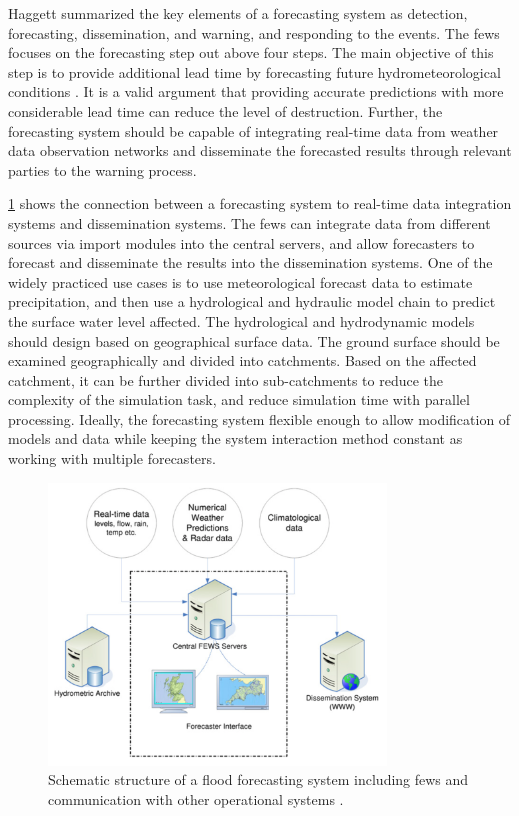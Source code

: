 Haggett \cite{Haggett1998AnWales} summarized the key elements of a forecasting system as detection, forecasting, dissemination, and warning, and responding to the events. The \acrshort{fews} focuses on the forecasting step out above four steps. The main objective of this step is to provide additional lead time by forecasting future hydrometeorological conditions \cite{Werner2005FloodCatchments}. It is a valid argument that providing accurate predictions with more considerable lead time can reduce the level of destruction. Further, the forecasting system should be capable of integrating real-time data from weather data observation networks and disseminate the forecasted results through relevant parties to the warning process.

\cref{fi:fews_schematic} shows the connection between a forecasting system to real-time data integration systems and dissemination systems. The \acrshort{fews} can integrate data from different sources via import modules into the central servers, and allow forecasters to forecast and disseminate the results into the dissemination systems. One of the widely practiced use cases is to use meteorological forecast data to estimate precipitation, and then use a hydrological and hydraulic model chain to predict the surface water level affected. The hydrological and hydrodynamic models should design based on geographical surface data. The ground surface should be examined geographically and divided into catchments. Based on the affected catchment, it can be further divided into sub-catchments to reduce the complexity of the simulation task, and reduce simulation time with parallel processing. Ideally, the forecasting system flexible enough to allow modification of models and data while keeping the system interaction method constant as working with multiple forecasters.

\begin{figure}[htp]
    \centering
    \includegraphics[width=0.8\textwidth]{lit/fews/Schematic-structure-of-a-fl-ood-forecasting-system-showing-the-position-of-Delft-FEWS_W640.png}
    \caption[Schematic structure of a flood forecasting system including \acrshort{fews} and communication among other operational systems]{Schematic structure of a flood forecasting system including \acrshort{fews} and communication with other operational systems \cite{Werner2013TheSystem}.}
    \label{fi:fews_schematic}
\end{figure}

